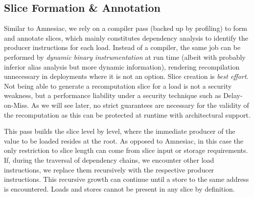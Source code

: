  
\subsection{Slice Formation \& Annotation}
Similar to Amnesiac, we rely on a compiler pass (backed up by profiling) to form and annotate slices, which 
 mainly constitutes
dependency analysis to
identify the producer instructions for each load.
{\color{magenta}  Instead of a compiler, the same job can be performed by \emph{dynamic binary instrumentation} at run time (albeit with probably inferior alias analysis but more dynamic information), rendering recompilation unnecessary in deployments where it is not an option.
Slice creation is \emph{best effort}. Not being able to generate a recomputation slice for a load is not a security weakness, but a performance liability under a security technique such as Delay-on-Miss. As we will see later, no strict guarantees are necessary for the validity of the recomputation as this can be protected at runtime with architectural support.}


This pass builds the slice level by level, where
the immediate producer of the value to be loaded resides at the root.
As opposed to Amnesiac, in this case the only restriction to slice length can come from slice input or storage requirements. 
If, during the traversal of dependency chains, we encounter other load instructions, we 
replace them recursively with the respective producer instructions. 
This recursive growth can continue until a store to the same address is encountered.
Loads and stores cannot be present 
in any slice by definition.

